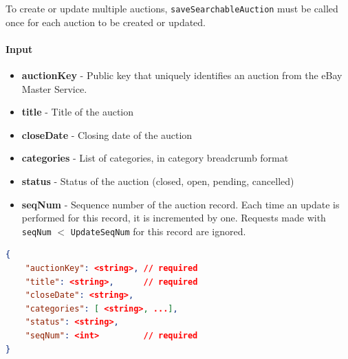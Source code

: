 \documentclass[12pt,a4paper]{article}
\begin{document}
\vspace{\baselineskip}

To create or update multiple auctions, \texttt{saveSearchableAuction} must be called 
once for each auction to be created or updated.
\paragraph{Input}

\begin{itemize}
    \item \textbf{auctionKey} - Public key that uniquely identifies an auction from the eBay Master Service.
    \item \textbf{title} - Title of the auction 
    \item \textbf{closeDate} - Closing date of the auction 
    \item \textbf{categories} -  List of categories, in category breadcrumb format
    \item \textbf{status} - Status of the auction (closed, open, pending, cancelled)
    \item \textbf{seqNum} - Sequence number of the auction record. Each time an update is performed for this record,
        it is incremented by one. Requests made with \texttt{seqNum} $<$ \texttt{UpdateSeqNum} for this record are ignored.
\end{itemize}
\begin{lstlisting}[language=json,numbers=none]
{
    "auctionKey": <string>, // required
    "title": <string>,      // required
    "closeDate": <string>,
    "categories": [ <string>, ...],
    "status": <string>,
    "seqNum": <int>         // required
}
\end{lstlisting}

\pagebreak
\end{document}
